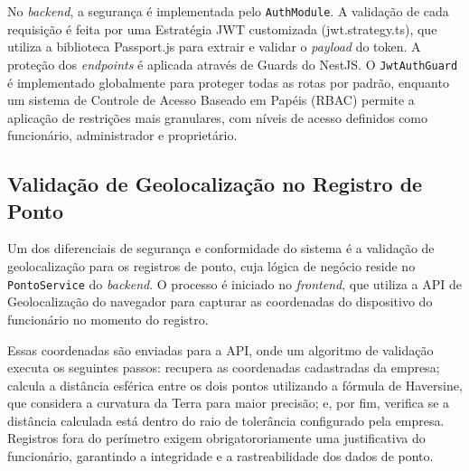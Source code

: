 No \textit{backend}, a segurança é implementada pelo \texttt{AuthModule}. A validação de cada requisição é feita por uma Estratégia JWT customizada (jwt.strategy.ts), que utiliza a biblioteca Passport.js para extrair e validar o \textit{payload} do token. A proteção dos \textit{endpoints} é aplicada através de Guards do NestJS. O \texttt{JwtAuthGuard} é implementado globalmente para proteger todas as rotas por padrão, enquanto um sistema de Controle de Acesso Baseado em Papéis (RBAC) permite a aplicação de restrições mais granulares, com níveis de acesso definidos como funcionário, administrador e proprietário.

\subsection{Validação de Geolocalização no Registro de Ponto}

Um dos diferenciais de segurança e conformidade do sistema é a validação de geolocalização para os registros de ponto, cuja lógica de negócio reside no \texttt{PontoService} do \textit{backend}. O processo é iniciado no \textit{frontend}, que utiliza a API de Geolocalização do navegador para capturar as coordenadas do dispositivo do funcionário no momento do registro.

Essas coordenadas são enviadas para a API, onde um algoritmo de validação executa os seguintes passos: recupera as coordenadas cadastradas da empresa; calcula a distância esférica entre os dois pontos utilizando a fórmula de Haversine, que considera a curvatura da Terra para maior precisão; e, por fim, verifica se a distância calculada está dentro do raio de tolerância configurado pela empresa. Registros fora do perímetro exigem obrigatororiamente uma justificativa do funcionário, garantindo a integridade e a rastreabilidade dos dados de ponto.